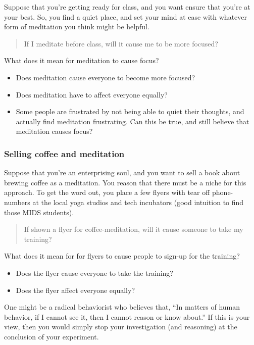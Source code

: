 \documentclass[
]{article}
\providecommand{\tightlist}{%
  \setlength{\itemsep}{0pt}\setlength{\parskip}{0pt}}
\begin{document}
Suppose that you're getting ready for class, and you want ensure that you're at your best. So, you find a quiet place, and set your mind at ease with whatever form of meditation you think might be helpful.

\begin{quote}
If I meditate before class, will it cause me to be more focused?
\end{quote}

What does it mean for meditation to cause focus?

\begin{itemize}
\tightlist
\item
  Does meditation cause everyone to become more focused?
\item
  Does meditation have to affect everyone equally?
\item
  Some people are frustrated by not being able to quiet their thoughts, and actually find meditation frustrating. Can this be true, and still believe that meditation causes focus?
\end{itemize}

\hypertarget{selling-coffee-and-meditation}{%
\subsubsection{Selling coffee and meditation}\label{selling-coffee-and-meditation}}

Suppose that you're an enterprising soul, and you want to sell a book about brewing coffee as a meditation. You reason that there must be a niche for this approach. To get the word out, you place a few flyers with tear off phone-numbers at the local yoga studios and tech incubators (good intuition to find those MIDS students).

\begin{quote}
If shown a flyer for coffee-meditation, will it cause someone to take my training?
\end{quote}

What does it mean for for flyers to cause people to sign-up for the training?

\begin{itemize}
\tightlist
\item
  Does the flyer cause everyone to take the training?
\item
  Does the flyer affect everyone equally?
\end{itemize}

One might be a radical behaviorist who believes that, ``In matters of human behavior, if I cannot see it, then I cannot reason or know about.'' If this is your view, then you would simply stop your investigation (and reasoning) at the conclusion of your experiment.
\end{document}

